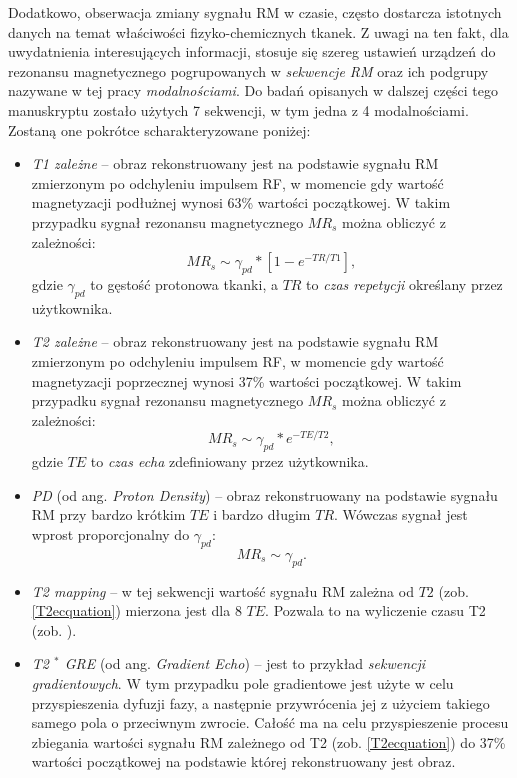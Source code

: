 Dodatkowo, obserwacja zmiany sygnału RM w czasie, często dostarcza istotnych danych na temat właściwości fizyko-chemicznych tkanek. Z uwagi na ten fakt, dla uwydatnienia interesujących informacji, stosuje się szereg ustawień urządzeń do rezonansu magnetycznego pogrupowanych w \textit{sekwencje RM} oraz ich podgrupy nazywane w tej pracy \textit{modalnościami}. Do badań opisanych w dalszej części tego manuskryptu zostało użytych 7 sekwencji, w tym jedna z 4 modalnościami. Zostaną one pokrótce scharakteryzowane poniżej:
\begin{itemize}
	\item \textit{T1 zależne} -- obraz rekonstruowany jest na podstawie sygnału RM zmierzonym po odchyleniu impulsem RF, w momencie gdy wartość magnetyzacji podłużnej wynosi 63\% wartości początkowej. W takim przypadku sygnał rezonansu magnetycznego $MR_s$ można obliczyć z zależności:
	\begin{equation}
		MR_s \sim \gamma_{pd} \ast [1-e^{-TR/T1}],
	\end{equation}
	gdzie $\gamma_{pd}$ to gęstość protonowa tkanki, a $TR$ to \textit{czas repetycji} określany przez użytkownika.
	\item \textit{T2 zależne} -- obraz rekonstruowany jest na podstawie sygnału RM zmierzonym po odchyleniu impulsem RF, w momencie gdy wartość magnetyzacji poprzecznej wynosi 37\% wartości początkowej. W takim przypadku sygnał rezonansu magnetycznego $MR_s$ można obliczyć z zależności:
	\begin{equation}
	\label{T2ecquation}
	MR_s \sim \gamma_{pd} \ast e^{-TE/T2},
	\end{equation}
	gdzie $TE$ to \textit{czas echa} zdefiniowany przez użytkownika.
	\item \textit{PD} (od ang. \textit{Proton Density}) -- obraz rekonstruowany na podstawie sygnału RM przy bardzo krótkim $TE$ i bardzo długim $TR$. Wówczas sygnał jest wprost proporcjonalny do $\gamma_{pd}$:
	\begin{equation}
	MR_s \sim \gamma_{pd}.
	\end{equation}
	\item \textit{T2 mapping} -- w tej sekwencji wartość sygnału RM zależna od $T2$ (zob. \ref{T2ecquation}) mierzona jest dla 8 $TE$. Pozwala to na wyliczenie czasu T2 (zob. \cite{Regulski2017}).
	\item \textit{T2 $^\ast$ GRE} (od ang. \textit{Gradient Echo}) -- jest to przykład \textit{sekwencji gradientowych}. W tym przypadku pole gradientowe jest użyte w celu przyspieszenia dyfuzji fazy, a następnie przywrócenia jej z użyciem takiego samego pola o przeciwnym zwrocie. Całość ma na celu przyspieszenie procesu zbiegania wartości sygnału RM zależnego od T2 (zob. \ref{T2ecquation}) do 37\% wartości początkowej na podstawie której rekonstruowany jest obraz. 

\end{itemize}
